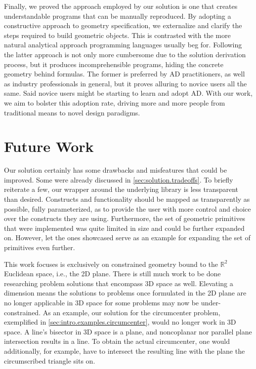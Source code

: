 Finally, we proved the approach employed by our solution is one that creates
understandable programs that can be manually reproduced.  By adopting a
constructive approach to geometry specification, we externalize and clarify the
steps required to build geometric objects.  This is contrasted with the more
natural analytical approach programming languages usually beg for.  Following
the latter approach is not only more cumbersome due to the solution derivation
process, but it produces incomprehensible programs, hiding the concrete geometry
behind formulas.  The former is preferred by \ac{AD} practitioners, as well as
industry professionals in general, but it proves alluring to novice users all
the same.  Said novice users might be starting to learn and adopt \ac{AD}.  With
our work, we aim to bolster this adoption rate, driving more and more people
from traditional means to novel design paradigms.

\section*{Future Work}

Our solution certainly has some drawbacks and misfeatures that could be
improved.  Some were already discussed in \cref{sec:solution.tradeoffs}.  To
briefly reiterate a few, our wrapper around the underlying library is less
transparent than desired.  Constructs and functionality should be mapped as
transparently as possible, fully parameterized, as to provide the user with more
control and choice over the constructs they are using.  Furthermore, the set of
geometric primitives that were implemented was quite limited in size and could
be further expanded on.  However, let the ones showcased serve as an example for
expanding the set of primitives even further.

This work focuses is exclusively on constrained geometry bound to the
$\mathbb{R}^2$ Euclidean space, i.e., the 2D plane.  There is still much work to
be done researching problem solutions that encompass 3D space as well.
Elevating a dimension means the solutions to problems once formulated in the 2D
plane are no longer applicable in 3D space for some problems may now be
under-constrained.  As an example, our solution for the circumcenter problem,
exemplified in \cref{sec:intro.examples.circumcenter}, would no longer work in
3D space.  A line's bisector in 3D space is a plane, and noncoplanar nor
parallel plane intersection results in a line.  To obtain the actual
circumcenter, one would additionally, for example, have to intersect the
resulting line with the plane the circumscribed triangle sits on.
